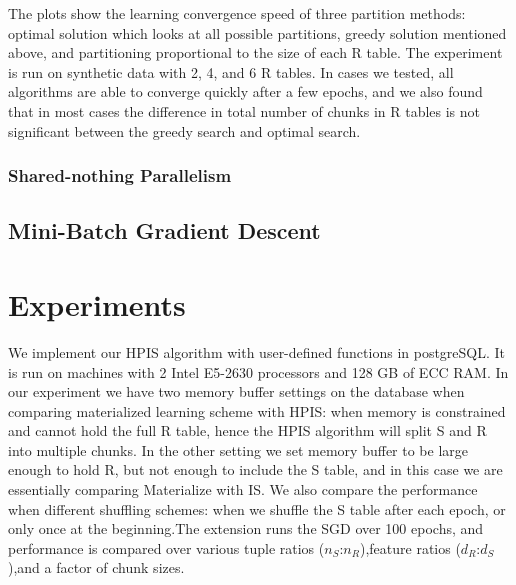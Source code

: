 \documentclass{vldb}
\begin{document}
The plots show the learning convergence speed of three partition methods: optimal solution which looks at all possible partitions, greedy solution mentioned above, and partitioning proportional to the size of each R table. The experiment is run on synthetic data with 2, 4, and 6 R tables. In cases we tested, all algorithms are able to converge quickly after a few epochs, and we also found that in most cases the difference in total number of chunks in R tables is not significant between the greedy search and optimal search.

\subsubsection{Shared-nothing Parallelism}


\subsection{Mini-Batch Gradient Descent}


\section{Experiments}

We implement our HPIS algorithm with user-defined functions in postgreSQL.
It is run on machines with 2 Intel E5-2630 processors and 128 GB of ECC RAM.
In our experiment we have two memory buffer settings on the database when comparing materialized learning scheme with HPIS: when memory is constrained and cannot hold the full R table, hence the HPIS algorithm will split S and R into multiple chunks. In the other setting we set memory buffer to be large enough to hold R, but not enough to include the S table, and in this case we are essentially comparing Materialize with IS. We also compare the performance when different shuffling schemes: when we shuffle the S table after each epoch, or only once at the beginning.The extension runs the SGD over 100 epochs, and performance is compared over various tuple ratios ($n_S$:$n_R$),feature ratios ($d_R$:$d_S$),and a factor of chunk sizes.
\end{document}
